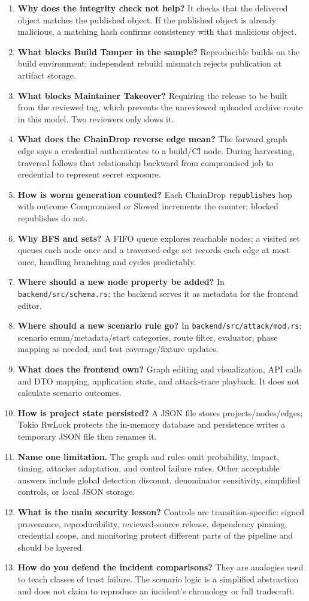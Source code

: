 \documentclass[11pt,oneside]{book}
\newcommand{\code}[1]{\texttt{\small #1}}
\begin{document}
\begin{enumerate}
\item \textbf{Why does the integrity check not help?} It checks that the delivered object matches the published object. If the published object is already malicious, a matching hash confirms consistency with that malicious object.
\item \textbf{What blocks Build Tamper in the sample?} Reproducible builds on the build environment; independent rebuild mismatch rejects publication at artifact storage.
\item \textbf{What blocks Maintainer Takeover?} Requiring the release to be built from the reviewed tag, which prevents the unreviewed uploaded archive route in this model. Two reviewers only slows it.
\item \textbf{What does the ChainDrop reverse edge mean?} The forward graph edge says a credential authenticates to a build/CI node. During harvesting, traversal follows that relationship backward from compromised job to credential to represent secret exposure.
\item \textbf{How is worm generation counted?} Each ChainDrop \code{republishes} hop with outcome Compromised or Slowed increments the counter; blocked republishes do not.
\item \textbf{Why BFS and sets?} A FIFO queue explores reachable nodes; a visited set queues each node once and a traversed-edge set records each edge at most once, handling branching and cycles predictably.
\item \textbf{Where should a new node property be added?} In \code{backend/src/schema.rs}; the backend serves it as metadata for the frontend editor.
\item \textbf{Where should a new scenario rule go?} In \code{backend/src/attack/mod.rs}: scenario enum/metadata/start categories, route filter, evaluator, phase mapping as needed, and test coverage/fixture updates.
\item \textbf{What does the frontend own?} Graph editing and visualization, API calls and DTO mapping, application state, and attack-trace playback. It does not calculate scenario outcomes.
\item \textbf{How is project state persisted?} A JSON file stores projects/nodes/edges; Tokio RwLock protects the in-memory database and persistence writes a temporary JSON file then renames it.
\item \textbf{Name one limitation.} The graph and rules omit probability, impact, timing, attacker adaptation, and control failure rates. Other acceptable answers include global detection discount, denominator sensitivity, simplified controls, or local JSON storage.
\item \textbf{What is the main security lesson?} Controls are transition-specific: signed provenance, reproducibility, reviewed-source release, dependency pinning, credential scope, and monitoring protect different parts of the pipeline and should be layered.
\item \textbf{How do you defend the incident comparisons?} They are analogies used to teach classes of trust failure. The scenario logic is a simplified abstraction and does not claim to reproduce an incident's chronology or full tradecraft.
\end{enumerate}
\end{document}
